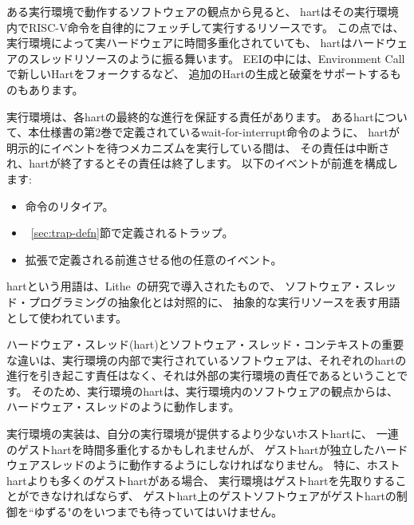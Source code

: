 ある実行環境で動作するソフトウェアの観点から見ると、
hartはその実行環境内でRISC-V命令を自律的にフェッチして実行するリソースです。 
この点では、実行環境によって実ハードウェアに時間多重化されていても、
hartはハードウェアのスレッドリソースのように振る舞います。
EEIの中には、Environment Callで新しいHartをフォークするなど、
追加のHartの生成と破棄をサポートするものもあります。

実行環境は、各hartの最終的な進行を保証する責任があります。
あるhartについて、本仕様書の第2巻で定義されているwait-for-interrupt命令のように、
hartが明示的にイベントを待つメカニズムを実行している間は、
その責任は中断され、hartが終了するとその責任は終了します。
以下のイベントが前進を構成します:

\vspace{-0.2in}
\begin{itemize}
\parskip 0pt
\itemsep 1pt
\item 命令のリタイア。
\item ~\ref{sec:trap-defn}節で定義されるトラップ。
\item 拡張で定義される前進させる他の任意のイベント。
\end{itemize}

\begin{commentary}
hartという用語は、Lithe~\cite{lithe-pan-hotpar09,lithe-pan-pldi10}の研究で導入されたもので、
ソフトウェア・スレッド・プログラミングの抽象化とは対照的に、
抽象的な実行リソースを表す用語として使われています。

ハードウェア・スレッド(hart)とソフトウェア・スレッド・コンテキストの重要な違いは、実行環境の内部で実行されているソフトウェアは、それぞれのhartの進行を引き起こす責任はなく、それは外部の実行環境の責任であるということです。 そのため、実行環境のhartは、実行環境内のソフトウェアの観点からは、
ハードウェア・スレッドのように動作します。

実行環境の実装は、自分の実行環境が提供するより少ないホストhartに、
一連のゲストhartを時間多重化するかもしれませんが、
ゲストhartが独立したハードウェアスレッドのように動作するようにしなければなりません。
特に、ホストhartよりも多くのゲストhartがある場合、
実行環境はゲストhartを先取りすることができなければならず、
ゲストhart上のゲストソフトウェアがゲストhartの制御を``ゆずる"のをいつまでも待っていてはいけません。

\end{commentary}

